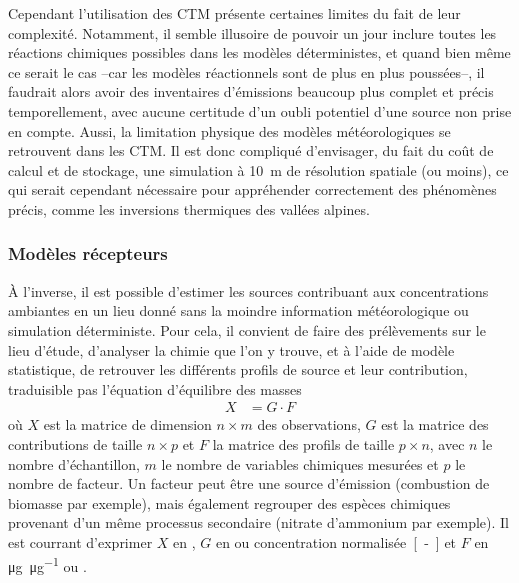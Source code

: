 Cependant l'utilisation des CTM présente certaines limites du fait de leur complexité.
Notamment, il semble illusoire de pouvoir un jour inclure toutes les réactions chimiques
possibles dans les modèles déterministes, et quand bien même ce serait le cas --car les
modèles réactionnels sont de plus en plus poussées--, il faudrait alors avoir des
inventaires d'émissions beaucoup plus complet et précis temporellement, avec aucune
certitude d'un oubli potentiel d'une source non prise en compte.  Aussi, la limitation
physique des modèles météorologiques se retrouvent dans les CTM. Il est donc compliqué
d'envisager, du fait du coût de calcul et de stockage, une simulation à \SI{10}{m} de
résolution spatiale (ou moins), ce qui serait cependant nécessaire pour appréhender
correctement des phénomènes précis, comme les inversions thermiques des vallées alpines.

\subsubsection{Modèles récepteurs}%
\label{ssub:model_recepteur}

À l'inverse, il est possible d'estimer les sources contribuant aux concentrations
ambiantes en un lieu donné sans la moindre information météorologique ou simulation
déterministe. Pour cela, il convient de faire des prélèvements sur le lieu d'étude,
d'analyser la chimie que l'on y trouve, et à l'aide de modèle statistique, de retrouver
les différents profils de source et leur contribution, traduisible pas l'équation
d'équilibre des masses
\begin{align}
    \label{eq:mass_balance}
    X &= G \cdot F
\end{align}
où $X$ est la matrice de dimension $n\times m$ des observations, $G$ est la matrice des
contributions de taille $n\times p$ et $F$ la matrice des profils de taille $p \times n$,
avec $n$ le nombre d'échantillon, $m$ le nombre de variables chimiques mesurées et $p$ le
nombre de facteur. Un facteur peut être une source d'émission (combustion de biomasse par
exemple), mais également regrouper des espèces chimiques provenant d'un même processus
secondaire (nitrate d'ammonium par exemple).
Il est courrant d'exprimer $X$ en \si{\ugm}, $G$ en \si{\ugm} ou concentration
normalisée~\si{[-]} et $F$ en \si{\micro\g\per\micro\g} ou \si{\ugm}.

